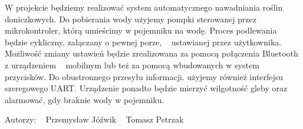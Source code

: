 W projekcie będziemy realizować system automatycznego nawadniania roślin doniczkowych. Do pobierania wody użyjemy pompki sterowanej przez ~\newline
 mikrokontroler, którą umieścimy w pojemniku na wodę. Proces podlewania będzie cykliczny, załączany o pewnej porze, ~\newline
 ustawianej przez użytkownika. Możliwość zmiany ustawień będzie zrealizowana za pomocą połączenia Bluetooth z urządzeniem ~\newline
 mobilnym lub też za pomocą wbudowanych w system przycisków. Do obustronnego przesyłu informacji. użyjemy również interfejsu szeregowego UART. Urządzenie ponadto będzie mierzyć wilgotność gleby oraz alarmować, gdy braknie wody w pojemniku. ~\newline


Autorzy\+: ~\newline
 Przemysław Jóźwik ~\newline
 Tomasz Petrzak ~\newline
 
